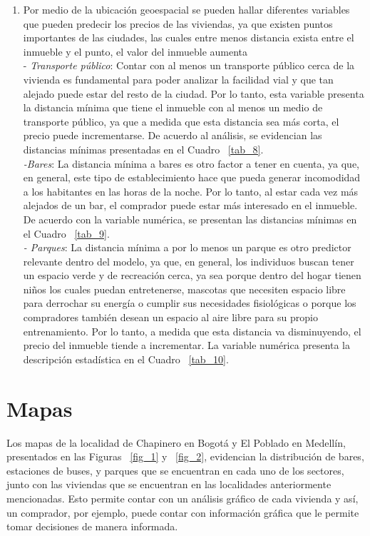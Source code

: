 \documentclass[conference, 10pt]{IEEEtran}
\begin{document}
\begin{enumerate}
\item	Por medio de la ubicación geoespacial se pueden hallar diferentes variables que pueden predecir los precios de las viviendas, ya que existen puntos importantes de las ciudades, las cuales entre menos distancia exista entre el inmueble y el punto, el valor del inmueble aumenta\\
-\textit{	Transporte público}: Contar con al menos un transporte público cerca de la vivienda es fundamental para poder analizar la facilidad vial y que tan alejado puede estar del resto de la ciudad. Por lo tanto, esta variable presenta la distancia mínima que tiene el inmueble con al menos un medio de transporte público, ya que a medida que esta distancia sea más corta, el precio puede incrementarse. De acuerdo al análisis, se evidencian las distancias mínimas presentadas en el Cuadro ~\ref{tab_8}.\\
\textit{-Bares}: La distancia mínima a bares es otro factor a tener en cuenta, ya que, en general, este tipo de establecimiento hace que pueda generar incomodidad a los habitantes en las horas de la noche. Por lo tanto, al estar cada vez más alejados de un bar, el comprador puede estar más interesado en el inmueble. De acuerdo con la variable numérica, se presentan las distancias mínimas en el Cuadro ~\ref{tab_9}.\\
\textit{-	Parques}: La distancia mínima a por lo menos un parque es otro predictor relevante dentro del modelo, ya que, en general, los individuos buscan tener un espacio verde y de recreación cerca, ya sea porque dentro del hogar tienen niños los cuales puedan entretenerse, mascotas que necesiten espacio libre para derrochar su energía o cumplir sus necesidades fisiológicas o porque los compradores también desean un espacio al aire libre para su propio entrenamiento. Por lo tanto, a medida que esta distancia va disminuyendo, el precio del inmueble tiende a incrementar. La variable numérica presenta la descripción estadística en el Cuadro ~\ref{tab_10}.
\end{enumerate}

\section{Mapas}
Los  mapas de la localidad de Chapinero en Bogotá y El Poblado en Medellín, presentados en las Figuras ~\ref{fig_1} y ~\ref{fig_2}, evidencian la distribución de bares, estaciones de buses, y parques que se encuentran en cada uno de los sectores, junto con las viviendas que se encuentran en las localidades anteriormente mencionadas. Esto permite contar con un análisis gráfico de cada vivienda y así, un comprador, por ejemplo, puede contar con información gráfica que le permite tomar decisiones de manera informada.
\end{document}
